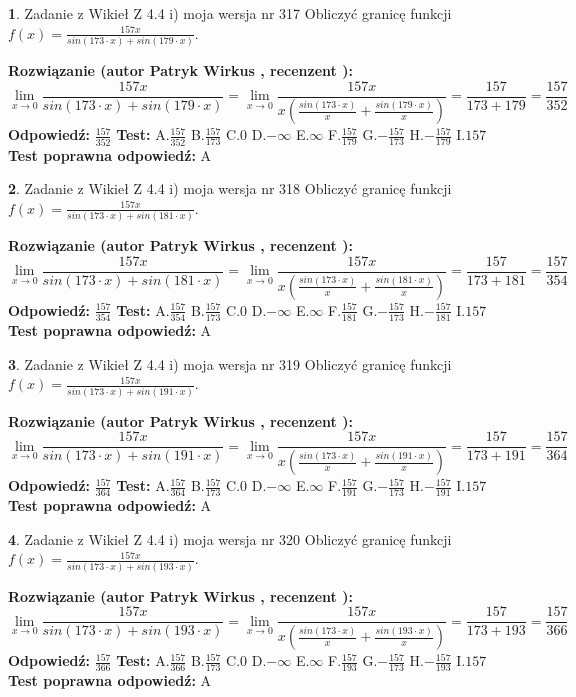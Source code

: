 \documentclass[12pt, a4paper]{article}
\theoremstyle{definition} %
\newtheorem{zad}{}
\newcommand{\zadStart}[1]{\begin{zad}#1\newline}
\newcommand{\zadStop}{\end{zad}}
\newcommand{\rozwStart}[2]{\noindent \textbf{Rozwiązanie (autor #1 , recenzent #2): }\newline}
\newcommand{\rozwStop}{\newline}
\newcommand{\odpStart}{\noindent \textbf{Odpowiedź:}\newline}
\newcommand{\odpStop}{\newline}
\newcommand{\testStart}{\noindent \textbf{Test:}\newline}
\newcommand{\testStop}{\newline}
\newcommand{\kluczStart}{\noindent \textbf{Test poprawna odpowiedź:}\newline}
\newcommand{\kluczStop}{\newline}
\begin{document}
\zadStart{Zadanie z Wikieł Z 4.4 i) moja wersja nr 317}
Obliczyć granicę funkcji $f(x)=\frac{157x}{sin(173\cdot x) +sin(179\cdot x)}$.
\zadStop
\rozwStart{Patryk Wirkus}{}
$$\lim\limits_{x\to 0}\frac{157x}{sin(173\cdot x) +sin(179\cdot x)}=\lim\limits_{x\to 0}\frac{157x}{x(\frac{sin(173\cdot x)}{x}+\frac{sin(179\cdot x)}{x})}=\frac{157}{173+179} = \frac{157}{352}$$
\rozwStop
\odpStart
$\frac{157}{352}$
\odpStop
\testStart
A.$\frac{157}{352}$
B.$\frac{157}{173}$
C.$0$
D.$-\infty$
E.$\infty$
F.$\frac{157}{179}$
G.$-\frac{157}{173}$
H.$-\frac{157}{179}$
I.$157$
\testStop
\kluczStart
A
\kluczStop



\zadStart{Zadanie z Wikieł Z 4.4 i) moja wersja nr 318}
Obliczyć granicę funkcji $f(x)=\frac{157x}{sin(173\cdot x) +sin(181\cdot x)}$.
\zadStop
\rozwStart{Patryk Wirkus}{}
$$\lim\limits_{x\to 0}\frac{157x}{sin(173\cdot x) +sin(181\cdot x)}=\lim\limits_{x\to 0}\frac{157x}{x(\frac{sin(173\cdot x)}{x}+\frac{sin(181\cdot x)}{x})}=\frac{157}{173+181} = \frac{157}{354}$$
\rozwStop
\odpStart
$\frac{157}{354}$
\odpStop
\testStart
A.$\frac{157}{354}$
B.$\frac{157}{173}$
C.$0$
D.$-\infty$
E.$\infty$
F.$\frac{157}{181}$
G.$-\frac{157}{173}$
H.$-\frac{157}{181}$
I.$157$
\testStop
\kluczStart
A
\kluczStop



\zadStart{Zadanie z Wikieł Z 4.4 i) moja wersja nr 319}
Obliczyć granicę funkcji $f(x)=\frac{157x}{sin(173\cdot x) +sin(191\cdot x)}$.
\zadStop
\rozwStart{Patryk Wirkus}{}
$$\lim\limits_{x\to 0}\frac{157x}{sin(173\cdot x) +sin(191\cdot x)}=\lim\limits_{x\to 0}\frac{157x}{x(\frac{sin(173\cdot x)}{x}+\frac{sin(191\cdot x)}{x})}=\frac{157}{173+191} = \frac{157}{364}$$
\rozwStop
\odpStart
$\frac{157}{364}$
\odpStop
\testStart
A.$\frac{157}{364}$
B.$\frac{157}{173}$
C.$0$
D.$-\infty$
E.$\infty$
F.$\frac{157}{191}$
G.$-\frac{157}{173}$
H.$-\frac{157}{191}$
I.$157$
\testStop
\kluczStart
A
\kluczStop



\zadStart{Zadanie z Wikieł Z 4.4 i) moja wersja nr 320}
Obliczyć granicę funkcji $f(x)=\frac{157x}{sin(173\cdot x) +sin(193\cdot x)}$.
\zadStop
\rozwStart{Patryk Wirkus}{}
$$\lim\limits_{x\to 0}\frac{157x}{sin(173\cdot x) +sin(193\cdot x)}=\lim\limits_{x\to 0}\frac{157x}{x(\frac{sin(173\cdot x)}{x}+\frac{sin(193\cdot x)}{x})}=\frac{157}{173+193} = \frac{157}{366}$$
\rozwStop
\odpStart
$\frac{157}{366}$
\odpStop
\testStart
A.$\frac{157}{366}$
B.$\frac{157}{173}$
C.$0$
D.$-\infty$
E.$\infty$
F.$\frac{157}{193}$
G.$-\frac{157}{173}$
H.$-\frac{157}{193}$
I.$157$
\testStop
\kluczStart
A
\kluczStop
\end{document}
